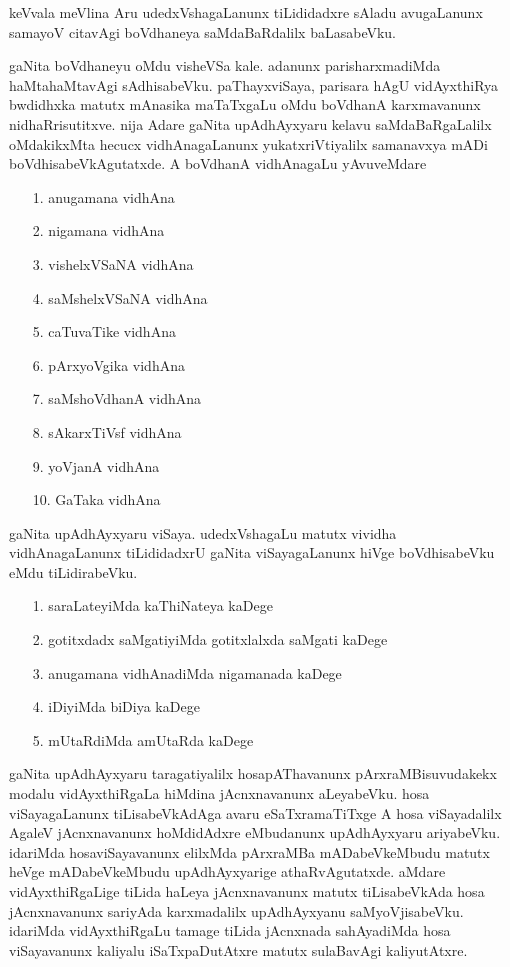 keVvala meVlina Aru udedxVshagaLanunx tiLididadxre sAladu avugaLanunx samayoV\- citavAgi boVdhaneya saMdaBaRdalilx baLasabeVku.

gaNita boVdhaneyu oMdu visheVSa kale. adanunx parisharxmadiMda haMtahaMtavAgi sAdhisabeVku. paThayxviSaya,  parisara hAgU vidAyxthiRya bwdidhxka matutx mAnasika maTaTxgaLu oMdu boVdhanA karxmavanunx nidhaRrisutitxve. nija Adare gaNita upAdhAyxyaru kelavu saMdaBaRgaLalilx oMdakikxMta hecucx vidhAnagaLanunx yukatxriVtiyalilx samanavxya mADi boVdhisabeVkAgutatxde. A boVdhanA vidhAnagaLu yAvuveMdare
\begin{enumerate}
\item[{\rm 1.}] anugamana vidhAna
\item[{\rm 2.}] nigamana vidhAna
\item[{\rm 3.}] vishelxVSaNA vidhAna
\item[{\rm 4.}] saMshelxVSaNA vidhAna
\item[{\rm 5.}] caTuvaTike vidhAna
\item[{\rm 6.}] pArxyoVgika vidhAna
\item[{\rm 7.}] saMshoVdhanA vidhAna
\item[{\rm 8.}] sAkarxTiVsf vidhAna
\item[{\rm 9.}] yoVjanA vidhAna
\item[{\rm 10.}] GaTaka vidhAna
\end{enumerate}

gaNita upAdhAyxyaru viSaya. udedxVshagaLu matutx vividha vidhAnagaLanunx tiLididadxrU gaNita viSayagaLanunx hiVge boVdhisabeVku eMdu tiLidirabeVku.
\begin{enumerate}
\item[{\rm 1.}] saraLateyiMda kaThiNateya kaDege
\item[{\rm 2.}] gotitxdadx saMgatiyiMda gotitxlalxda saMgati kaDege
\item[{\rm 3.}] anugamana vidhAnadiMda nigamanada kaDege
\item[{\rm 4.}] iDiyiMda biDiya kaDege
\item[{\rm 5.}] mUtaRdiMda amUtaRda kaDege
\end{enumerate}

gaNita upAdhAyxyaru taragatiyalilx hosapAThavanunx pArxraMBisuvudakekx modalu vidAyxthiRgaLa hiMdina jAcnxnavanunx aLeyabeVku. hosa viSayagaLanunx tiLisabeVkAdAga avaru eSaTxramaTiTxge A hosa viSayadalilx AgaleV jAcnxnavanunx hoMdidAdxre eMbudanunx upAdhAyxyaru ariyabeVku. idariMda hosaviSayavanunx elilxMda pArxraMBa mADabeVkeMbudu matutx heVge mADabeVkeMbudu upAdhAyxyarige athaRvAgutatxde. aMdare vidAyxthiRgaLige tiLida haLeya jAcnxnavanunx matutx tiLisabeVkAda hosa jAcnxnavanunx sariyAda karxmadalilx upAdhAyxyanu saMyoVjisabeVku. idariMda vidAyxthiRgaLu tamage tiLida jAcnxnada sahAyadiMda hosa viSayavanunx kaliyalu iSaTxpaDutAtxre matutx sulaBavAgi kaliyutAtxre.


